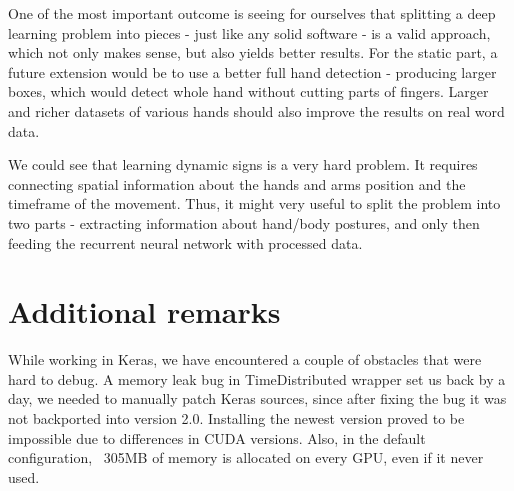 \documentclass[10pt,twocolumn,letterpaper]{article}
\begin{document}
One of the most important outcome is seeing for ourselves that splitting
a deep learning problem into pieces - just like any solid software - is
a valid approach, which not only makes sense, but also yields better results.
For the static part, a future extension would be to use a better full hand detection - producing
larger boxes, which would detect whole hand without cutting parts of fingers. 
Larger and richer datasets of various hands should also improve the
results on real word data.

We could see that learning dynamic signs is a very
hard problem. It requires connecting spatial information about the hands and arms position and the
timeframe of the movement. Thus, it might very useful to split the problem into two parts
- extracting information about hand/body postures, and only then feeding the recurrent neural network with processed data.

\section{Additional remarks}

While working in Keras, we have encountered a couple of obstacles that were hard to debug.
A memory leak bug in TimeDistributed wrapper set us back by a day, we needed to manually patch Keras
sources, since after fixing the bug it was not backported into version 2.0. 
Installing the newest version proved to be impossible due to differences in CUDA versions.
Also, in the default configuration, ~305MB of memory is allocated on every GPU, even if it never used.


{\small


}
\end{document}
